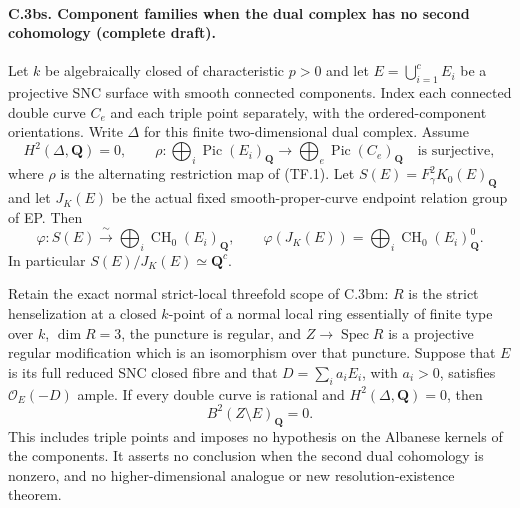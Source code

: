 \paragraph{C.3bs. Component families when the dual complex has no second
cohomology (complete draft).}
Let $k$ be algebraically closed of characteristic $p>0$ and let
$E=\bigcup_{i=1}^cE_i$ be a projective SNC surface with smooth connected
components. Index each connected double curve $C_e$ and each triple
point separately, with the ordered-component orientations. Write
$\Delta$ for this finite two-dimensional dual complex. Assume
\begin{equation}
 H^2(\Delta,\mathbf Q)=0,\qquad
 \rho:\bigoplus_i\operatorname{Pic}(E_i)_{\mathbf Q}
       \longrightarrow\bigoplus_e\operatorname{Pic}(C_e)_{\mathbf Q}
       \quad\text{is surjective},                         \tag{DC.1}
\end{equation}
where $\rho$ is the alternating restriction map of (TF.1).
Let $S(E)=F_\gamma^2K_0(E)_{\mathbf Q}$ and let $J_K(E)$ be the
actual fixed smooth-proper-curve endpoint relation group of EP.
Then
\begin{equation}
 \varphi:S(E)\xrightarrow{\ \sim\ }
           \bigoplus_i\operatorname{CH}_0(E_i)_{\mathbf Q},
 \qquad
 \varphi(J_K(E))=
           \bigoplus_i\operatorname{CH}_0(E_i)^0_{\mathbf Q}.
                                                               \tag{DC.2}
\end{equation}
In particular $S(E)/J_K(E)\simeq\mathbf Q^c$.

Retain the exact normal strict-local threefold scope of C.3bm:
$R$ is the strict henselization at a closed $k$-point of a normal
local ring essentially of finite type over $k$, $\dim R=3$, the
puncture is regular, and $Z\to\operatorname{Spec}R$ is a projective
regular modification which is an isomorphism over that puncture.
Suppose that $E$ is its full reduced SNC closed fibre and that
$D=\sum_i a_iE_i$, with $a_i>0$, satisfies $\mathcal O_E(-D)$ ample.
If every double curve is rational and $H^2(\Delta,\mathbf Q)=0$, then
\begin{equation}
                        B^2(Z\setminus E)_{\mathbf Q}=0. \tag{DC.3}
\end{equation}
This includes triple points and imposes no hypothesis on the
Albanese kernels of the components. It asserts no conclusion when
the second dual cohomology is nonzero, and no higher-dimensional
analogue or new resolution-existence theorem.

